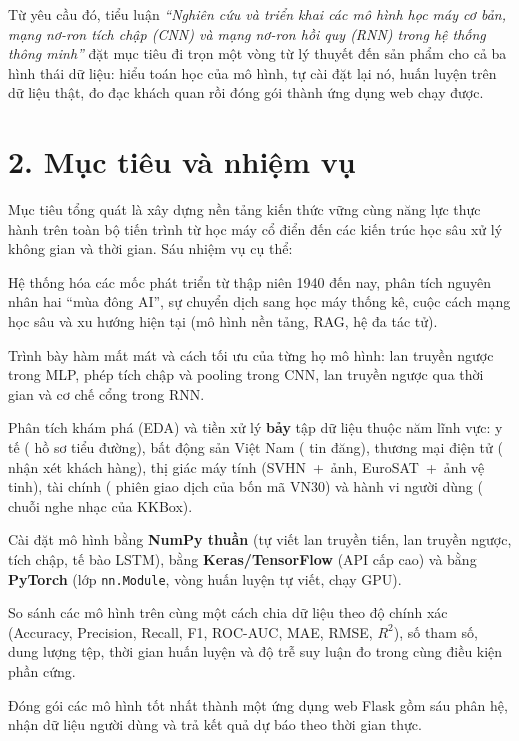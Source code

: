 Từ yêu cầu đó, tiểu luận \emph{“Nghiên cứu và triển khai các mô hình học máy cơ bản, mạng nơ-ron tích chập (CNN)
và mạng nơ-ron hồi quy (RNN) trong hệ thống thông minh”} đặt mục tiêu đi trọn một vòng từ lý thuyết đến sản phẩm
cho cả ba hình thái dữ liệu: hiểu toán học của mô hình, tự cài đặt lại nó, huấn luyện trên dữ liệu thật, đo đạc
khách quan rồi đóng gói thành ứng dụng web chạy được.

\section*{2. Mục tiêu và nhiệm vụ}

Mục tiêu tổng quát là xây dựng nền tảng kiến thức vững cùng năng lực thực hành trên toàn bộ tiến trình từ học máy
cổ điển đến các kiến trúc học sâu xử lý không gian và thời gian. Sáu nhiệm vụ cụ thể:

\begin{description}[leftmargin=2.2em, style=nextline]
  \item[Nhiệm vụ 1 -- Khảo cứu lịch sử AI.] Hệ thống hóa các mốc phát triển từ thập niên 1940 đến nay, phân tích
    nguyên nhân hai “mùa đông AI”, sự chuyển dịch sang học máy thống kê, cuộc cách mạng học sâu và xu hướng hiện tại
    (mô hình nền tảng, RAG, hệ đa tác tử).
  \item[Nhiệm vụ 2 -- Cơ sở lý thuyết.] Trình bày hàm mất mát và cách tối ưu của từng họ mô hình: lan truyền ngược
    trong MLP, phép tích chập và pooling trong CNN, lan truyền ngược qua thời gian và cơ chế cổng trong RNN.
  \item[Nhiệm vụ 3 -- Khảo sát dữ liệu thật.] Phân tích khám phá (EDA) và tiền xử lý \textbf{bảy} tập dữ liệu thuộc
    năm lĩnh vực: y tế ( hồ sơ tiểu đường), bất động sản Việt Nam ( tin đăng),
    thương mại điện tử ( nhận xét khách hàng), thị giác máy tính (SVHN
    \,+\, ảnh, EuroSAT \,+\, ảnh vệ tinh),
    tài chính ( phiên giao dịch của bốn mã VN30) và hành vi người dùng
    ( chuỗi nghe nhạc của KKBox).
  \item[Nhiệm vụ 4 -- Hiện thực trên ba nền tảng.] Cài đặt mô hình bằng \textbf{NumPy thuần} (tự viết lan truyền tiến,
    lan truyền ngược, tích chập, tế bào LSTM), bằng \textbf{Keras/TensorFlow} (API cấp cao) và bằng
    \textbf{PyTorch} (lớp \texttt{nn.Module}, vòng huấn luyện tự viết, chạy GPU).
  \item[Nhiệm vụ 5 -- Đánh giá và đối chuẩn.] So sánh các mô hình trên cùng một cách chia dữ liệu theo độ chính xác
    (Accuracy, Precision, Recall, F1, ROC-AUC, MAE, RMSE, $R^2$), số tham số, dung lượng tệp, thời gian huấn luyện
    và độ trễ suy luận đo trong cùng điều kiện phần cứng.
  \item[Nhiệm vụ 6 -- Triển khai.] Đóng gói các mô hình tốt nhất thành một ứng dụng web Flask gồm sáu phân hệ, nhận
    dữ liệu người dùng và trả kết quả dự báo theo thời gian thực.
\end{description}

